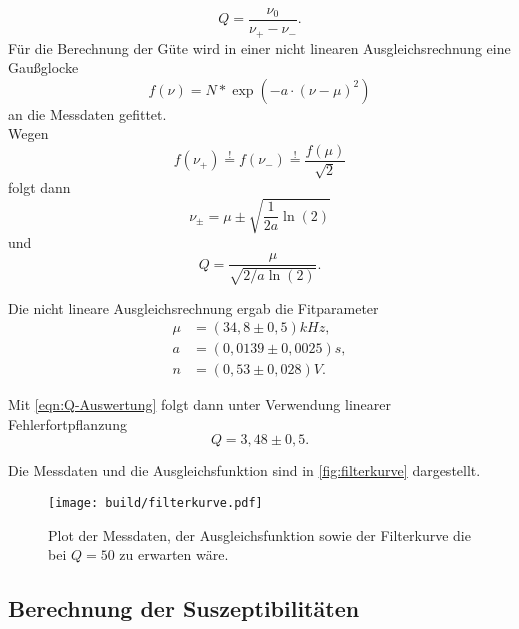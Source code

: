 \[
	Q = \frac{\nu_0}{\nu_+ - \nu_-}.
\]
Für die Berechnung der Güte wird in einer nicht linearen Ausgleichsrechnung eine
Gaußglocke
\begin{equation}
	\label{eqn:gauss-glocke}
	f(\nu) = N * \exp\left(-a \cdot (\nu - \mu)^2\right)
\end{equation}
an die Messdaten gefittet.
\\
Wegen
\begin{equation}
	f(\nu_+) \overset{!}{=} 
	f(\nu_-) \overset{!}{=} 
	\frac{f(\mu)}{\sqrt{2}}
\end{equation}
folgt dann
\begin{equation}
	\label{eqn:nu-plus-minus}
	\nu_\pm = \mu \pm \sqrt{\frac{1}{2a} \ln(2)}
\end{equation}
und 
\begin{equation}
	\label{eqn:Q-Auswertung}
	Q = \frac{\mu}{\sqrt{2/a \ln(2)}}.
\end{equation}

Die nicht lineare Ausgleichsrechnung ergab die Fitparameter
\begin{align}
	\label{eqn:fit-ergebnisse}
	\mu &= (34,8 \pm 0,5) \si{kHz}, \\
	a &= (0,0139 \pm 0,0025) \si{s}, \\
	n &= (0,53 \pm 0,028) \si{V}.
\end{align}

Mit \autoref{eqn:Q-Auswertung} folgt dann unter Verwendung linearer Fehlerfortpflanzung
\begin{equation}
	Q = 3,48 \pm 0,5.
\end{equation}

Die Messdaten und die Ausgleichsfunktion sind in \autoref{fig:filterkurve} dargestellt.

\begin{figure}
	\texttt{[image: build/filterkurve.pdf]}
	\caption{Plot der Messdaten, der Ausgleichsfunktion sowie der Filterkurve die bei
	$Q=50$ zu erwarten wäre.}
	\label{fig:filterkurve}
\end{figure}

\subsection{Berechnung der Suszeptibilitäten}
\label{sec:Berechnung der Suszeptibilitäten}

